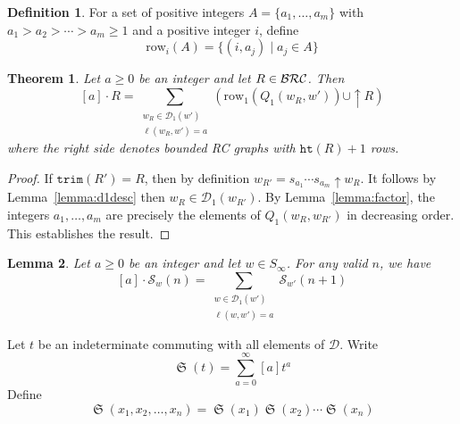 \documentclass{amsart}
\newtheorem{lemma}{Lemma}[subsection]
\newtheorem{theorem}{Theorem}[section]
\theoremstyle{definition}
\newtheorem{definition}[lemma]{Definition}
\theoremstyle{remark}
\numberwithin{equation}{subsection}
\DeclareMathOperator{\sch}{\mathfrak{S}}
\newcommand{\shup}{{\uparrow}}
\newcommand{\wof}[1]{w_{#1}}
\newcommand{\trm}{\mathtt{trim}}
\newcommand{\hr}{\mathtt{ht}}
\newcommand{\dcoma}{\mathcal{D}}
\begin{document}
\begin{definition}
For a set of positive integers $A=\{a_1,\ldots, a_m\}$ with $a_1>a_2>\cdots > a_m\geq 1$ and a positive integer $i$, define
$$\mathrm{row}_i(A) = \{(i, a_j) \mid a_j\in A\}$$
\end{definition}

\begin{theorem} \label{theorem:modactrc}
Let $a\geq 0$ be an integer and let $R\in \mathcal{BRC}$. Then
$$[a]\cdot R = \sum_{\substack{\wof{R}\in \mathcal{D}_1(w')\\\ell(\wof{R},w')=a}} \left(\mathrm{row}_1(Q_1(\wof{R},w'))\cup \shup{R}\right)$$
where the right side denotes bounded RC graphs with $\hr(R)+1$ rows.
\end{theorem}
\begin{proof}
	If $\trm(R') = R$, then by definition $\wof{R'} = s_{a_1}\cdots s_{a_m}\shup \wof{R}$. It follows by Lemma~\ref{lemma:d1desc} then $\wof{R}\in \mathcal{D}_1(\wof{R'})$. By Lemma~\ref{lemma:factor}, the integers $a_1,\ldots, a_m$ are precisely the elements of $Q_1(\wof{R},\wof{R'})$ in decreasing order. This establishes the result.
\end{proof}


\begin{lemma} \label{lemma:drcpieri}
	Let $a\geq 0$ be an integer and let $w\in S_\infty$. For any valid $n$, we have
	$$[a]\cdot \mathcal{S}_w(n) = \sum_{\substack{w\in \mathcal{D}_1(w')\\\ell(w,w')=a}} \mathcal{S}_{w'}(n+1)$$
\end{lemma}

Let $t$ be an indeterminate commuting with all elements of $\dcoma$. Write
$$\sch(t) = \sum_{a=0}^\infty [a]t^a$$
Define
$$\sch(x_1,x_2,\ldots,x_n) = \sch(x_1)\sch(x_2)\cdots \sch(x_n)$$
\end{document}

